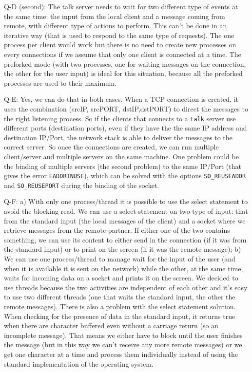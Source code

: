 Q-D (second): The talk server needs to wait for two different type of events at the same time: the input from the local client and a message coming from remote, with different type of actions to perform. This can't be done in an iterative way (that is used to respond to the same type of requests). The one process per client would work but there is no need to create new processes on every connections if we assume that only one client is connected at a time. The preforked mode (with two processes, one for waiting messages on the connection, the other for the user input) is ideal for this situation, because all the preforked processes are used to their maximum. \newline

Q-E: Yes, we can do that in both cases. When a TCP connection is created, it uses the combination (srcIP, srcPORT, dstIP,dstPORT) to direct the messages to the right listening process. So if the clients that connects to a \texttt{talk} server use different ports (destination ports), even if they have the the same IP address and destination IP/Port, the network stack is able to deliver the messages to the correct server. So once the connections are created, we can run multiple client/server and multiple servers on the same machine. One problem could be the binding of multiple servers (the second problem) to the same IP/Port (that gives the error \texttt{EADDRINUSE}), which can be solved with the options \texttt{SO\_REUSEADDR} and \texttt{SO\_REUSEPORT} during the binding of the socket. \newline

Q-F: a) With only one process/thread it is possible to use the select statement to avoid the blocking read. We can use a select statement on two type of input: that from the standard input (the local messages of the client) and a socket where we retrieve messages from the remote partner. If either one of the two contains something, we can use its content to either send in the connection (if it was from the standard input) or to print on the screen (if it was the remote message);
b) We can use one process/thread to manage wait for the input of the user (and when it is available it is sent on the network) while the other, at the same time, waits for incoming data on a socket and prints it on the screen.
We decided to use threads because the two activities are independent of each other and it's easy to use two different threads (one that waits the standard input, the other the remote messages). There is also a problem with the select statement solution. When checking for the presence of data in the standard input, it returns true when there are character buffered even without a carriage return (so an incomplete message). That means we either have to block until the user finishes the message (but in this way we can't receive any more remote messages) or we get one character at a time and process them individually instead of using the standard implementation of the operating system.


